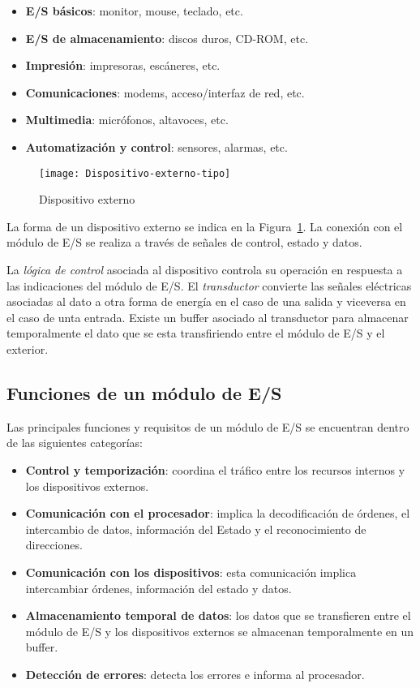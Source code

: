 \begin{itemize}
  \item \textbf{E/S básicos}: monitor, mouse, teclado, etc.
  \item \textbf{E/S de almacenamiento}: discos duros, CD-ROM, etc.
  \item \textbf{Impresión}: impresoras, escáneres, etc.
  \item \textbf{Comunicaciones}: modems, acceso/interfaz de red, etc.
  \item \textbf{Multimedia}: micrófonos, altavoces, etc.
  \item \textbf{Automatización y control}: sensores, alarmas, etc.
\end{itemize}

\begin{figure}[H]
  \centering
  \texttt{[image: Dispositivo-externo-tipo]}
  \caption{Dispositivo externo}\label{fig:Dispositivo-externo-tipo}
\end{figure}

La forma de un dispositivo externo se indica en la Figura~\ref{fig:Dispositivo-externo-tipo}. La conexión con el módulo de E/S se realiza a través de señales de control, estado y datos.

La \textit{lógica de control} asociada al dispositivo controla su operación en respuesta a las indicaciones del módulo de E/S. El \textit{transductor} convierte las señales eléctricas asociadas al dato a otra forma de energía en el caso de una salida y viceversa en el caso de unta entrada. Existe un buffer asociado al transductor para almacenar temporalmente el dato que se esta transfiriendo entre el módulo de E/S y el exterior.

\subsection{Funciones de un módulo de E/S}

Las principales funciones y requisitos de un módulo de E/S se encuentran dentro de las siguientes categorías:

\begin{itemize}
  \item \textbf{Control y temporización}: coordina el tráfico entre los recursos internos y los dispositivos externos.
  \item \textbf{Comunicación con el procesador}: implica la decodificación de órdenes, el intercambio de datos, información del Estado y el reconocimiento de direcciones.
  \item \textbf{Comunicación con los dispositivos}: esta comunicación implica intercambiar órdenes, información del estado y datos.
  \item \textbf{Almacenamiento temporal de datos}: los datos que se transfieren entre el módulo de E/S y los dispositivos externos se almacenan temporalmente en un buffer.
  \item \textbf{Detección de errores}: detecta los errores e informa al procesador.
\end{itemize}

